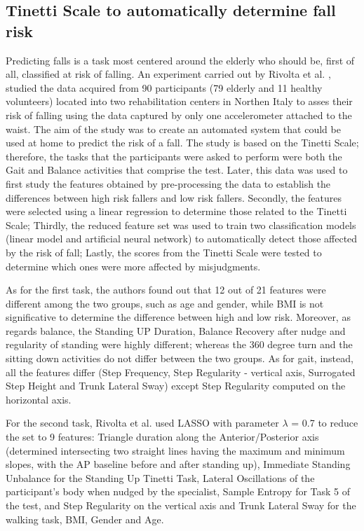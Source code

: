 \subsection{Tinetti Scale to automatically determine fall risk}
Predicting falls is a task most centered around the elderly who should be, first of all, classified at risk of falling. An experiment carried out by Rivolta et al. \cite{TinettiScale}, studied the data acquired from 90 participants (79 elderly and 11 healthy volunteers) located into two rehabilitation centers in Northen Italy to asses their risk of falling using the data captured by only one accelerometer attached to the waist. The aim of the study was to create an automated system that could be used at home to predict the risk of a fall.
The study is based on the Tinetti Scale; therefore, the tasks that the participants were asked to perform were both the Gait and Balance activities that comprise the test. Later, this data was used to first study the features obtained by pre-processing the data to establish the differences between high risk fallers and low risk fallers. Secondly, the features were selected using a linear regression to determine those related to the Tinetti Scale; Thirdly, the reduced feature set was used to train two classification models (linear model and artificial neural network) to automatically detect those affected by the risk of fall; Lastly, the scores from the Tinetti Scale were tested to determine which ones were more affected by misjudgments. 

As for the first task, the authors found out that 12 out of 21 features were different among the two groups, such as age and gender, while BMI is not significative to determine the difference between high and low risk.
Moreover, as regards balance, the Standing UP Duration, Balance Recovery after nudge and regularity of standing were highly different; whereas the 360 degree turn and the sitting down activities do not differ between the two groups.
As for gait, instead, all the features differ (Step Frequency, Step Regularity - vertical axis, Surrogated Step Height and Trunk Lateral Sway) except Step Regularity computed on the horizontal axis. 

For the second task, Rivolta et al. used LASSO with parameter $\lambda$ = 0.7 to reduce the set to 9 features: Triangle duration along the Anterior/Posterior axis (determined intersecting two straight lines having the maximum and minimum slopes, with the
AP baseline before and after standing up),  Immediate Standing Unbalance for the Standing Up Tinetti Task, Lateral Oscillations of the participant's body when nudged by the specialist, Sample Entropy for Task 5 of the test, and Step Regularity on the vertical axis and Trunk Lateral Sway for the walking task, BMI, Gender and Age.

